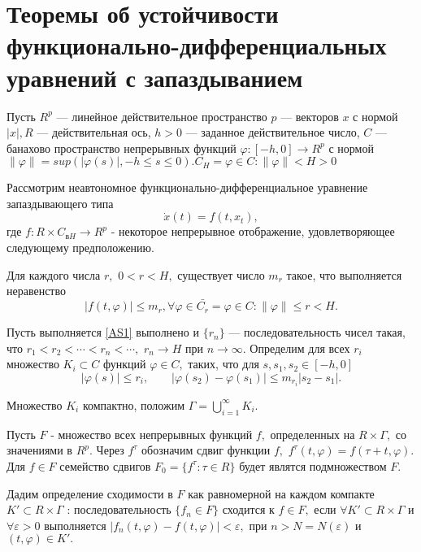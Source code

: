 \section{Теоремы об устойчивости функционально-дифференциальных уравнений с запаздыванием} \label{p11}

	Пусть $R^p$ --- линейное действительное пространство $p$ --- векторов $x$ с нормой $|x|,  R$ 
	--- действительная ось, $h>0$ --- заданное действительное число, $C$ --- банахово пространство
	непрерывных функций $\varphi:[-h,0] \rightarrow R^p$ с нормой $\|\varphi\|=sup(|\varphi(s)|,-h \le s \le 0). C_H = {\varphi \in C : \| \varphi \| < H > 0}$
	
	Рассмотрим неавтономное  функционально-дифференциальное
	уравнение запаздывающего типа
	\begin{equation}
	\dot x(t) = f(t,x_t), \label{1.1'}
	\end{equation}
	где $f: R \times C_{вH}\to R^p$ - некоторое непрерывное отображение,
	удовлетворяющее  следующему предположению.
	
	\begin{Ass}\label{AS1} Для  каждого  числа $r,$ $0<r<H,$
		существует число $m_r$ такое, что выполняется неравенство
		\begin{equation}\label{1.2'}
		\left| f(t, \varphi) \right|\le m_r, \forall \varphi \in \bar{C_r} = {\varphi \in C: \| \varphi \| \le r < H}.
		\end{equation}
	\end{Ass}
	
	Пусть выполняется \ref{AS1} выполнено и $\{r_n\}$ ---
	последовательность чисел такая, что $r_1<r_2<\cdots <r_n<\cdots, $
	$r_n\to H$ при $n\to \infty .$ Определим для всех $r_i$
	множество $K_i\subset C$ функций $\varphi \in C,$ таких, что
	для $s, s_1,s_2 \in [-h,0]$  $$|\varphi (s)|\le r_i, \qquad
	|\varphi (s_2)-\varphi (s_1)|\le m_{r_i} |s_2-s_1|.$$
	
	Множество $K_i$ компактно, положим $\Gamma =\bigcup\limits_{i=1}^{\infty } {K_i}.$
	
	Пусть $F$ - множество всех непрерывных функций $f,$
	определенных на $R \times \Gamma,$ со значениями в $R^p.$
	Через $f^{\tau }$ обозначим сдвиг функции $f,$ $f^{\tau }(t,\varphi )=f(\tau +t,\varphi ).$
	Для $f\in F$ семейство сдвигов $F_0=\{f^{\tau }:\tau\in
	R\}$ будет являтся подмножеством $F.$
	
	Дадим определение сходимости в $F$ как равномерной на каждом компакте
	$K'\subset R\times \Gamma $ : последовательность
	$\{f_n\in F\}$ сходится к $f\in F,$ если $\forall K'\subset
	R\times\Gamma $ и $\forall \varepsilon >0$ выполняется $|f_n(t,\varphi
	)-f(t,\varphi )|<\varepsilon,$ при $n>N=N(\varepsilon )$ и
	$(t,\varphi )\in K'.$
	

